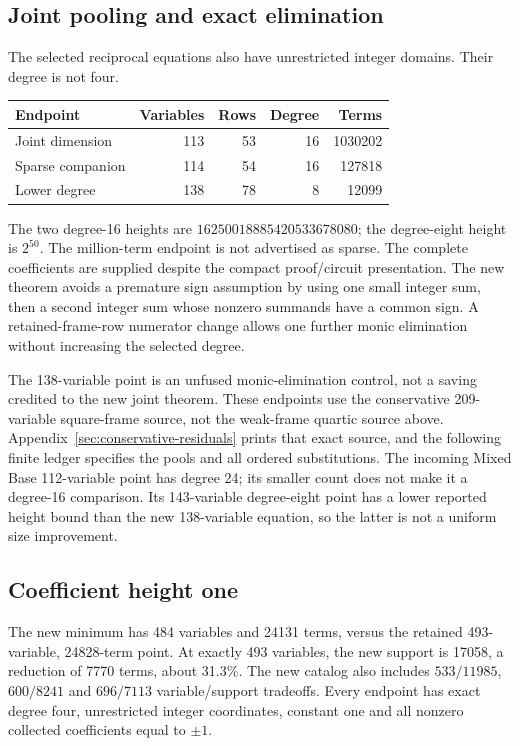 \subsection{Joint pooling and exact elimination}
The selected reciprocal equations also have unrestricted integer domains.
Their degree is not four.
\begin{center}\small
\begin{tabular}{@{}lrrrr@{}}\toprule
Endpoint & Variables & Rows & Degree & Terms\\\midrule
Joint dimension &113&53&16&1030202\\
Sparse companion &114&54&16&127818\\
Lower degree &138&78&8&12099\\\bottomrule
\end{tabular}
\end{center}
The two degree-16 heights are $16250018885420533678080$; the degree-eight
height is $2^{50}$. The million-term endpoint is not advertised as sparse.
The complete coefficients are supplied despite the compact proof/circuit
presentation. The new theorem avoids a premature sign assumption by using
one small integer sum, then a second integer sum whose nonzero summands have
a common sign. A retained-frame-row numerator change allows one further
monic elimination without increasing the selected degree.

The 138-variable point is an unfused monic-elimination control, not a saving
credited to the new joint theorem. These endpoints use the conservative
209-variable square-frame source,
not the weak-frame quartic source above. Appendix~\ref{sec:conservative-residuals}
prints that exact source, and the following finite ledger specifies the
pools and all ordered substitutions. The incoming Mixed Base 112-variable
point has degree 24; its smaller count does not make it a degree-16
comparison. Its 143-variable degree-eight point has a lower reported height
bound than the new 138-variable equation, so the latter is not a uniform
size improvement.

\subsection{Coefficient height one}
The new minimum has 484 variables and 24131 terms, versus the retained
493-variable, 24828-term point. At exactly 493 variables, the new support
is 17058, a reduction of 7770 terms, about 31.3\%. The new catalog also
includes $533/11985$, $600/8241$ and $696/7113$ variable/support tradeoffs.
Every endpoint has exact degree four, unrestricted integer coordinates,
constant one and all nonzero collected coefficients equal to $\pm1$.

